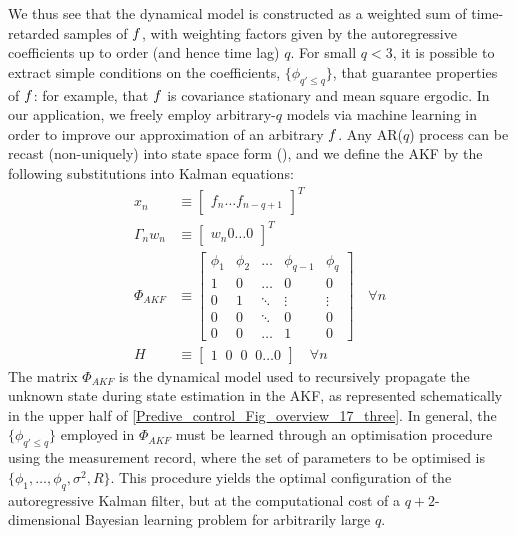 \noindent We thus see that the dynamical model is constructed as a weighted sum of time-retarded samples of $f$, with weighting factors given by the autoregressive coefficients up to order (and hence time lag) $q$. For small $q < 3$, it is possible to extract simple conditions on the coefficients, $\{ \phi_{q' \leq q} \}$, that guarantee properties of $f$: for example, that $f$ is covariance stationary and mean square ergodic. In our application, we freely employ arbitrary-$q$ models via machine learning in order to improve our approximation of an arbitrary $f$. Any AR($q$) process can be recast (non-uniquely) into state space form (\cite{harvey1990forecasting}), and we define the AKF by the following substitutions into Kalman equations:
\begin{align}
x_n & \equiv  \begin{bmatrix} f_{n} \hdots f_{n-q+1} \end{bmatrix}^T \\
\Gamma_n w_n & \equiv \begin{bmatrix} w_{n} 0 \hdots 0 \end{bmatrix}^T \\
\Phi_{AKF} & \equiv 
\begin{bmatrix}
\phi_1 & \phi_2 & \hdots & \phi_{q-1} & \phi_q \\ 
1 & 0 & \hdots & 0 & 0 \\  
0 & 1 & \ddots & \vdots & \vdots \\ 
0 & 0 & \ddots & 0 & 0 \\ 
0 & 0 & \hdots & 1 & 0 
\end{bmatrix} \quad \forall n \label{eqn:akf_Phi} \\
H & \equiv \begin{bmatrix} 1\;\;0\;\;0\;\;0\hdots0 \end{bmatrix} \quad \forall n  
\end{align}
The matrix $\Phi_{AKF}$ is the dynamical model used to recursively propagate the unknown state during state estimation in the AKF, as represented schematically in the upper half of \cref{Predive_control_Fig_overview_17_three}. In general, the $\{\phi_{q' \leq q}\}$ employed in $\Phi_{AKF}$ must be learned through an optimisation procedure using the measurement record, where the set of parameters to be optimised is $\{\phi_1, \hdots, \phi_q, \sigma^2, R \}$. This procedure yields the optimal configuration of the autoregressive Kalman filter, but at the computational cost of a $q+2$-dimensional Bayesian learning problem for arbitrarily large $q$.

